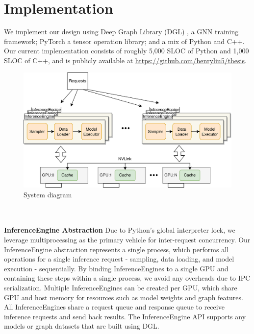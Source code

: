 \chapter{Implementation}
We implement our design using Deep Graph Library (DGL) \cite{DGL_2019}, a GNN training framework; PyTorch \cite{PyTorch_2019} a tensor operation library; and a mix of Python and C++.
Our current implementation consists of roughly 5,000 SLOC of Python and 1,000 SLOC of C++, and is publicly available at \url{https://github.com/henryliu5/thesis}.
\begin{figure}[h!]
    \centering
    \includegraphics[width=\textwidth]{diagrams/group_meeting_gnn-System Diagram.png}
    
    \caption{System diagram}
    \label{Our system diagram}
\end{figure} 
\\ \\
\noindent \textbf{InferenceEngine Abstraction} \quad Due to Python's global interpreter lock, we leverage multiprocessing as the primary vehicle for inter-request concurrency. Our InferenceEngine abstraction represents a single process, which performs all operations for a single inference request - sampling, data loading, and model execution - sequentially. By binding InferenceEngines to a single GPU and containing these steps within a single process, we avoid any overheads due to IPC serialization. Multiple InferenceEngines can be created per GPU, which share GPU and host memory for resources such as model weights and graph features. All InferenceEngines share a request queue and response queue to receive inference requests and send back results. The InferenceEngine API supports any models or graph datasets that are built using DGL.
